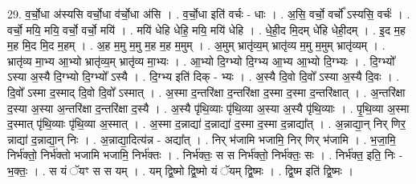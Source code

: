 \documentclass[17pt]{extarticle}
\begin{document}
29. व॒र्चो॒धा अ॑स्यसि वर्चो॒धा व॑र्चो॒धा अ॑सि । . व॒र्चो॒धा इति॑ वर्चः - धाः । . अ॒सि॒ वर्चो॒ वर्चो᳚ ऽस्यसि॒ वर्चः॑ । . वर्चो॒ मयि॒ मयि॒ वर्चो॒ वर्चो॒ मयि॑ । . मयि॑ धेहि धेहि॒ मयि॒ मयि॑ धेहि । . धे॒ही॒द मि॒दम् धे॑हि धेही॒दम् । . इ॒द म॒ह म॒ह मि॒द मि॒द म॒हम् । . अ॒ह म॒मु म॒मु म॒ह म॒ह म॒मुम् । . अ॒मुम् भ्रातृ॑व्य॒म् भ्रातृ॑व्य म॒मु म॒मुम् भ्रातृ॑व्यम् । . भ्रातृ॑व्य मा॒भ्य आ॒भ्यो भ्रातृ॑व्य॒म् भ्रातृ॑व्य मा॒भ्यः । . आ॒भ्यो दि॒ग्भ्यो दि॒ग्भ्य आ॒भ्य आ॒भ्यो दि॒ग्भ्यः । . दि॒ग्भ्यो᳚ ऽस्या अ॒स्यै दि॒ग्भ्यो दि॒ग्भ्यो᳚ ऽस्यै । . दि॒ग्भ्य इति॑ दिक् - भ्यः । . अ॒स्यै दि॒वो दि॒वो᳚ ऽस्या अ॒स्यै दि॒वः । . दि॒वो᳚ ऽस्मा द॒स्माद् दि॒वो दि॒वो᳚ ऽस्मात् । . अ॒स्मा द॒न्तरि॑क्षा द॒न्तरि॑क्षा द॒स्मा द॒स्मा द॒न्तरि॑क्षात् । . अ॒न्तरि॑क्षा द॒स्या अ॒स्या अ॒न्तरि॑क्षा द॒न्तरि॑क्षा द॒स्यै । . अ॒स्यै पृ॑थि॒व्याः पृ॑थि॒व्या अ॒स्या अ॒स्यै पृ॑थि॒व्याः । . पृ॒थि॒व्या अ॒स्मा द॒स्मात् पृ॑थि॒व्याः पृ॑थि॒व्या अ॒स्मात् । . अ॒स्मा द॒न्नाद्या॑ द॒न्नाद्या॑ द॒स्मा द॒स्मा द॒न्नाद्या᳚त् । . अ॒न्नाद्या॒न् निर् णिर॒ न्नाद्या॑ द॒न्नाद्या॒न् निः । . अ॒न्नाद्या॒दित्य॑न्न - अद्या᳚त् । . निर् भ॑जामि भजामि॒ निर् णिर् भ॑जामि । . भ॒जा॒मि॒ निर्भ॑क्तो॒ निर्भ॑क्तो भजामि भजामि॒ निर्भ॑क्तः । . निर्भ॑क्तः॒ स स निर्भ॑क्तो॒ निर्भ॑क्तः॒ सः । . निर्भ॑क्त॒ इति॒ निः - भ॒क्तः॒ । . स यं ॅयꣳ स स यम् । . यम् द्वि॒ष्मो द्वि॒ष्मो यं ॅयम् द्वि॒ष्मः । . द्वि॒ष्म इति॑ द्वि॒ष्मः । \newline
\end{document}
